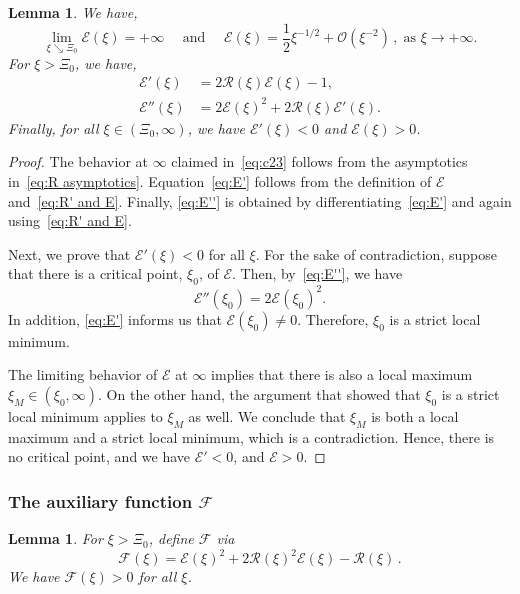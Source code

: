 \documentclass[10pt]{amsart}
\newtheorem{lemm}[theo]{Lemma}\newtheorem{prop}[theo]{Proposition}\newtheorem{coro}[theo]{Corollary}\newtheorem{conj}[theo]{Conjecture}
\theoremstyle{definition}\newtheorem{defi}[theo]{Definition}\newtheorem{rema}[theo]{Remark}\newtheorem{exam}[theo]{Example}\newtheorem{exem}[theo]{Example}\newtheorem{nota}[theo]{Notation}
\newcommand{\mE}{\mathcal{E}}
\newcommand{\mF}{\mathcal{F}}
\newcommand{\mR}{\mathcal{R}}
\newcommand{\mO}{\mathcal{O}}
\newcommand{\1}{\mathds{1}}
\begin{document}
\begin{lemm}\label{lem:E}
We have,
\begin{equation}\label{eq:c23}
\lim_{\xi \searrow \Xi_0} \mE(\xi) =+\infty
\quad \text{ and } \quad
\mE(\xi) = \frac12 \xi^{-1/2} + \mO\left(\xi^{-2}\right)\,,\; \text{as }\xi \to +\infty.
\end{equation}
For $\xi>\Xi_0$, we have,
\begin{align}\label{eq:E'}
\mE'(\xi) &= 2\mR(\xi) \mE(\xi) - 1,\\
\mE''(\xi) &= 2 \mE(\xi)^2 + 2 \mR(\xi) \mE'(\xi). \label{eq:E''}
\end{align}
Finally, for all $\xi\in (\Xi_0, \infty)$, we have $\mE'(\xi)<0$ and $\mE(\xi)>0$.
\end{lemm}

\begin{proof}
The behavior at $\infty$ claimed in~\eqref{eq:c23} follows from the asymptotics in~\eqref{eq:R asymptotics}. Equation~\eqref{eq:E'} follows from the definition of $\mE$ and~\eqref{eq:R' and E}. Finally, \eqref{eq:E''} is obtained by differentiating~\eqref{eq:E'} and again using~\eqref{eq:R' and E}.


Next, we prove that $\mE'(\xi)<0$ for all $\xi$. For the sake of contradiction, suppose that there is a critical point, $\xi_0$, of $\mE$. Then, by~\eqref{eq:E''}, we have
\[
\mE''(\xi_0) = 2\mE(\xi_0)^2.
\]
In addition, \eqref{eq:E'} informs us that $\mE(\xi_0)\neq 0$. Therefore, $\xi_0$ is a strict local minimum.


The limiting behavior of $\mE$ at $\infty$ implies that there is also a local maximum $\xi_M\in (\xi_0,\infty)$. On the other hand, the argument that showed that $\xi_0$ is a strict local minimum applies to $\xi_M$ as well. We conclude that $\xi_M$ is both a local maximum and a strict local minimum, which is a contradiction. Hence, there is no critical point, and we have $\mE' < 0$, and $\mE>0$.
\end{proof}



\subsubsection{The auxiliary function \texorpdfstring{$\mF$}{mF}}

\begin{lemm}\label{lem:mF>0}
For $\xi>\Xi_0$, define $\mF$ via
\begin{equation}\label{eq:mF}
\mF(\xi) =
\mE(\xi)^2 + 2 \mR(\xi)^2 \mE(\xi) - \mR(\xi)\,.
\end{equation}
We have $\mF(\xi)>0$ for all $\xi$.
\end{lemm}
\end{document}
